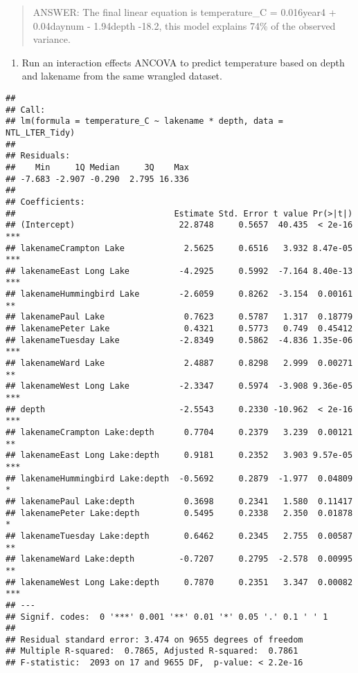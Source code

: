 \documentclass[]{article}
\newenvironment{Shaded}{\begin{snugshade}}{\end{snugshade}}
\newcommand{\KeywordTok}[1]{\textcolor[rgb]{0.13,0.29,0.53}{\textbf{#1}}}
\newcommand{\DataTypeTok}[1]{\textcolor[rgb]{0.13,0.29,0.53}{#1}}
\newcommand{\StringTok}[1]{\textcolor[rgb]{0.31,0.60,0.02}{#1}}
\newcommand{\CommentTok}[1]{\textcolor[rgb]{0.56,0.35,0.01}{\textit{#1}}}
\newcommand{\OperatorTok}[1]{\textcolor[rgb]{0.81,0.36,0.00}{\textbf{#1}}}
\newcommand{\NormalTok}[1]{#1}
\providecommand{\tightlist}{%
  \setlength{\itemsep}{0pt}\setlength{\parskip}{0pt}}
\begin{document}
\begin{quote}
ANSWER: The final linear equation is temperature\_C = 0.016year4 +
0.04daynum - 1.94depth -18.2, this model explains 74\% of the observed
variance.
\end{quote}

\begin{enumerate}
\def\labelenumi{\arabic{enumi}.}
\setcounter{enumi}{13}
\tightlist
\item
  Run an interaction effects ANCOVA to predict temperature based on
  depth and lakename from the same wrangled dataset.
\end{enumerate}

\begin{Shaded}
\end{Shaded}

\begin{verbatim}
## 
## Call:
## lm(formula = temperature_C ~ lakename * depth, data = NTL_LTER_Tidy)
## 
## Residuals:
##    Min     1Q Median     3Q    Max 
## -7.683 -2.907 -0.290  2.795 16.336 
## 
## Coefficients:
##                                Estimate Std. Error t value Pr(>|t|)    
## (Intercept)                     22.8748     0.5657  40.435  < 2e-16 ***
## lakenameCrampton Lake            2.5625     0.6516   3.932 8.47e-05 ***
## lakenameEast Long Lake          -4.2925     0.5992  -7.164 8.40e-13 ***
## lakenameHummingbird Lake        -2.6059     0.8262  -3.154  0.00161 ** 
## lakenamePaul Lake                0.7623     0.5787   1.317  0.18779    
## lakenamePeter Lake               0.4321     0.5773   0.749  0.45412    
## lakenameTuesday Lake            -2.8349     0.5862  -4.836 1.35e-06 ***
## lakenameWard Lake                2.4887     0.8298   2.999  0.00271 ** 
## lakenameWest Long Lake          -2.3347     0.5974  -3.908 9.36e-05 ***
## depth                           -2.5543     0.2330 -10.962  < 2e-16 ***
## lakenameCrampton Lake:depth      0.7704     0.2379   3.239  0.00121 ** 
## lakenameEast Long Lake:depth     0.9181     0.2352   3.903 9.57e-05 ***
## lakenameHummingbird Lake:depth  -0.5692     0.2879  -1.977  0.04809 *  
## lakenamePaul Lake:depth          0.3698     0.2341   1.580  0.11417    
## lakenamePeter Lake:depth         0.5495     0.2338   2.350  0.01878 *  
## lakenameTuesday Lake:depth       0.6462     0.2345   2.755  0.00587 ** 
## lakenameWard Lake:depth         -0.7207     0.2795  -2.578  0.00995 ** 
## lakenameWest Long Lake:depth     0.7870     0.2351   3.347  0.00082 ***
## ---
## Signif. codes:  0 '***' 0.001 '**' 0.01 '*' 0.05 '.' 0.1 ' ' 1
## 
## Residual standard error: 3.474 on 9655 degrees of freedom
## Multiple R-squared:  0.7865, Adjusted R-squared:  0.7861 
## F-statistic:  2093 on 17 and 9655 DF,  p-value: < 2.2e-16
\end{verbatim}
\end{document}
